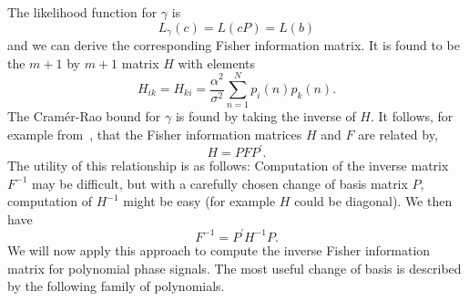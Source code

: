 \documentclass[review]{elsarticle}
\begin{document}
The likelihood function for $\gamma$ is 
\[
L_\gamma(c) = L(cP) = L(b)
\] 
and we can derive the corresponding Fisher information matrix.  It is found to be the $m+1$ by $m+1$ matrix $H$ with elements
\[
H_{ik} = H_{ki} = \frac{\alpha^2}{\sigma^2}\sum_{n=1}^{N} p_{i}(n) p_{k}(n).
\]
The Cram\'{e}r-Rao bound for $\gamma$ is found by taking the inverse of $H$.  It follows, for example from~\cite[Sec. 3.8]{Kay1993_stat_sig_est_theory}, that the Fisher information matrices $H$ and $F$ are related by,
\[
H = P F P^\prime.
\]
The utility of this relationship is as follows:  Computation of the inverse matrix $F^{-1}$ may be difficult, but with a carefully chosen change of basis matrix $P$, computation of $H^{-1}$ might be easy (for example $H$ could be diagonal).  We then have
\[
F^{-1} = P^\prime H^{-1} P.
\]  
We will now apply this approach to compute the inverse Fisher information matrix for polynomial phase signals.  The most useful change of basis is described by the following family of polynomials.


\end{document}
